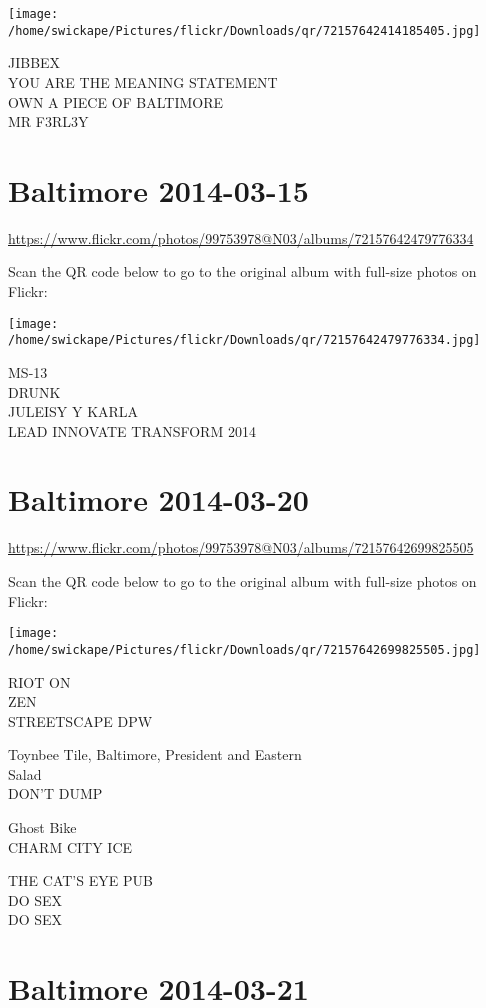 \documentclass[10pt,letterpaper]{article}
\begin{document}
\texttt{[image: /home/swickape/Pictures/flickr/Downloads/qr/72157642414185405.jpg]}


JIBBEX\\
YOU ARE THE MEANING STATEMENT\\
OWN A PIECE OF BALTIMORE\\
MR F3RL3Y


\section*{Baltimore 2014-03-15}

\url{https://www.flickr.com/photos/99753978@N03/albums/72157642479776334}

Scan the QR code below to go to the original album with full-size photos on Flickr:

\texttt{[image: /home/swickape/Pictures/flickr/Downloads/qr/72157642479776334.jpg]}


MS{-}13\\
DRUNK\\
JULEISY Y KARLA\\
LEAD INNOVATE TRANSFORM 2014


\section*{Baltimore 2014-03-20}

\url{https://www.flickr.com/photos/99753978@N03/albums/72157642699825505}

Scan the QR code below to go to the original album with full-size photos on Flickr:

\texttt{[image: /home/swickape/Pictures/flickr/Downloads/qr/72157642699825505.jpg]}


RIOT ON\\
ZEN\\
STREETSCAPE DPW

Toynbee Tile, Baltimore, President and Eastern\\
Salad\\
DON'T DUMP

Ghost Bike\\
CHARM CITY ICE

THE CAT'S EYE PUB\\
DO SEX\\
DO SEX


\section*{Baltimore 2014-03-21}
\end{document}
